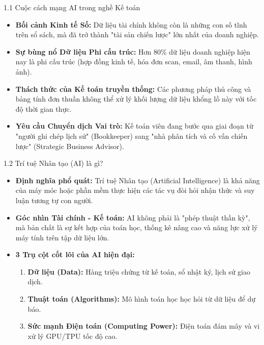 \documentclass[aspectratio=169]{beamer}
\begin{document}
\begin{frame}{1.1 Cuộc cách mạng AI trong nghề Kế toán}
    \begin{itemize}
        \item \textbf{Bối cảnh Kinh tế Số:} Dữ liệu tài chính không còn là những con số tĩnh trên sổ sách, mà đã trở thành "tài sản chiến lược" lớn nhất của doanh nghiệp.
        \item \textbf{Sự bùng nổ Dữ liệu Phi cấu trúc:} Hơn 80\% dữ liệu doanh nghiệp hiện nay là phi cấu trúc (hợp đồng kinh tế, hóa đơn scan, email, âm thanh, hình ảnh).
        \item \textbf{Thách thức của Kế toán truyền thống:} Các phương pháp thủ công và bảng tính đơn thuần không thể xử lý khối lượng dữ liệu khổng lồ này với tốc độ thời gian thực.
        \item \textbf{Yêu cầu Chuyển dịch Vai trò:} Kế toán viên đang bước qua giai đoạn từ "người ghi chép lịch sử" (Bookkeeper) sang "nhà phân tích và cố vấn chiến lược" (Strategic Business Advisor).
    \end{itemize}
\end{frame}

\begin{frame}{1.2 Trí tuệ Nhân tạo (AI) là gì?}
    \begin{itemize}
        \item \textbf{Định nghĩa phổ quát:} Trí tuệ Nhân tạo (Artificial Intelligence) là khả năng của máy móc hoặc phần mềm thực hiện các tác vụ đòi hỏi nhận thức và suy luận tương tự con người.
        \item \textbf{Góc nhìn Tài chính - Kế toán:} AI không phải là "phép thuật thần kỳ", mà bản chất là sự kết hợp của toán học, thống kê nâng cao và năng lực xử lý máy tính trên tập dữ liệu lớn.
        \item \textbf{3 Trụ cột cốt lõi của AI hiện đại:}
        \begin{enumerate}
            \item \textbf{Dữ liệu (Data):} Hàng triệu chứng từ kế toán, sổ nhật ký, lịch sử giao dịch.
            \item \textbf{Thuật toán (Algorithms):} Mô hình toán học học hỏi từ dữ liệu để dự báo.
            \item \textbf{Sức mạnh Điện toán (Computing Power):} Điện toán đám mây và vi xử lý GPU/TPU tốc độ cao.
        \end{enumerate}
    \end{itemize}
\end{frame}
\end{document}
